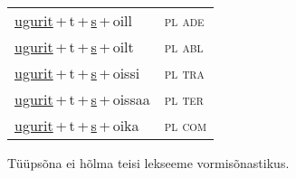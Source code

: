 \begin{minipage}{\textwidth}
\begin{sideways}
\begin{tabular}{l l}
\underline{ugurit}\,+\,t\,+\,\underline{s}\,+\,oill & \textsc{ pl ade } \\
\underline{ugurit}\,+\,t\,+\,\underline{s}\,+\,oilt & \textsc{ pl abl } \\
\underline{ugurit}\,+\,t\,+\,\underline{s}\,+\,oissi & \textsc{ pl tra } \\
\underline{ugurit}\,+\,t\,+\,\underline{s}\,+\,oissaa & \textsc{ pl ter } \\
\underline{ugurit}\,+\,t\,+\,\underline{s}\,+\,oika & \textsc{ pl com } \\
\end{tabular}
\end{sideways}
\label{tab:tüüpsõnamall-ugurittsõ}

\end{minipage}

 
\vspace{1em}
\noindent Tüüpsõna ei hõlma teisi lekseeme vormi\-sõnastikus.
